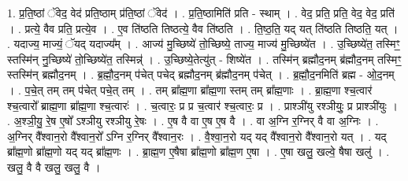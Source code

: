 \documentclass[17pt]{extarticle}
\begin{document}
1. प्र॒ति॒ष्ठां ॅवेद॒ वेद॑ प्रति॒ष्ठाम् प्र॑ति॒ष्ठां ॅवेद॑ । . प्र॒ति॒ष्ठामिति॑ प्रति - स्थाम् । . वेद॒ प्रति॒ प्रति॒ वेद॒ वेद॒ प्रति॑ । . प्रत्ये॒ वैव प्रति॒ प्रत्ये॒व । . ए॒व ति॑ष्ठति तिष्ठत्ये॒ वैव ति॑ष्ठति । . ति॒ष्ठ॒ति॒ यद् यत् ति॑ष्ठति तिष्ठति॒ यत् । . यदाज्य॒ माज्यं॒ ॅयद् यदाज्य᳚म् । . आज्य॑ मु॒च्छिष्ये॑ तो॒च्छिष्ये॒ ताज्य॒ माज्य॑ मु॒च्छिष्ये॑त । . उ॒च्छिष्ये॑त॒ तस्मिꣳ॒॒ स्तस्मि॑न् नु॒च्छिष्ये॑ तो॒च्छिष्ये॑त॒ तस्मिन्न्॑ । . उ॒च्छिष्ये॒तेत्यु॑त् - शिष्ये॑त । . तस्मि॑न् ब्रह्मौद॒नम् ब्र॑ह्मौद॒नम् तस्मिꣳ॒॒ स्तस्मि॑न् ब्रह्मौद॒नम् । . ब्र॒ह्मौ॒द॒नम् प॑चेत् पचेद् ब्रह्मौद॒नम् ब्र॑ह्मौद॒नम् प॑चेत् । . ब्र॒ह्मौ॒द॒नमिति॑ ब्रह्म - ओ॒द॒नम् । . प॒चे॒त् तम् तम् प॑चेत् पचे॒त् तम् । . तम् ब्रा᳚ह्म॒णा ब्रा᳚ह्म॒णा स्तम् तम् ब्रा᳚ह्म॒णाः । . ब्रा॒ह्म॒णा श्च॒त्वार॑ श्च॒त्वारो᳚ ब्राह्म॒णा ब्रा᳚ह्म॒णा श्च॒त्वारः॑ । . च॒त्वारः॒ प्र प्र च॒त्वार॑ श्च॒त्वारः॒ प्र । . प्राश्ञी॑यु रश्ञीयुः॒ प्र प्राश्ञी॑युः । . अ॒श्ञी॒यु॒ रे॒ष ए॒षो᳚ ऽश्ञीयु रश्ञीयु रे॒षः । . ए॒ष वै वा ए॒ष ए॒ष वै । . वा अ॒ग्नि र॒ग्निर् वै वा अ॒ग्निः । . अ॒ग्निर् वै᳚श्वान॒रो वै᳚श्वान॒रो᳚ ऽग्नि र॒ग्निर् वै᳚श्वान॒रः । . वै॒श्वा॒न॒रो यद् यद् वै᳚श्वान॒रो वै᳚श्वान॒रो यत् । . यद् ब्रा᳚ह्म॒णो ब्रा᳚ह्म॒णो यद् यद् ब्रा᳚ह्म॒णः । . ब्रा॒ह्म॒ण ए॒षैषा ब्रा᳚ह्म॒णो ब्रा᳚ह्म॒ण ए॒षा । . ए॒षा खलु॒ खल्वे॒ षैषा खलु॑ । . खलु॒ वै वै खलु॒ खलु॒ वै । \newline
\end{document}
